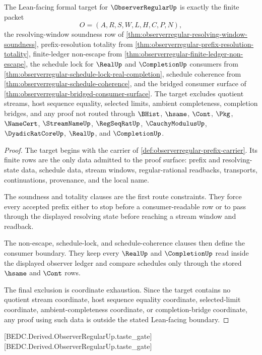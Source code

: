 \begin{theorem}
\label{thm:observerregular-formal-target-boundary}
The Lean-facing formal target for $\ObserverRegularUp$ is exactly the finite packet
$$
O=(A,R,S,W,L,H,C,P,N),
$$
the resolving-window soundness row of \autoref{thm:observerregular-resolving-window-soundness}, prefix-resolution totality from \autoref{thm:observerregular-prefix-resolution-totality}, finite-ledger non-escape from \autoref{thm:observerregular-finite-ledger-non-escape}, the schedule lock for $\RealUp$ and $\CompletionUp$ consumers from \autoref{thm:observerregular-schedule-lock-real-completion}, schedule coherence from \autoref{thm:observerregular-schedule-coherence}, and the bridged consumer surface of \autoref{thm:observerregular-bridged-consumer-surface}. The target excludes quotient streams, host sequence equality, selected limits, ambient completeness, completion bridges, and any proof not routed through $\BHist$, $\hsame$, $\Cont$, $\Pkg$, $\NameCert$, $\StreamNameUp$, $\RegSeqRatUp$, $\CauchyModulusUp$, $\DyadicRatCoreUp$, $\RealUp$, and $\CompletionUp$.
\end{theorem}
\begin{proof}
The target begins with the carrier of \autoref{def:observerregular-prefix-carrier}. Its finite rows are the only data admitted to the proof surface: prefix and resolving-state data, schedule data, stream windows, regular-rational readbacks, transports, continuations, provenance, and the local name.

The soundness and totality clauses are the first route constraints. They force every accepted prefix either to stop before a consumer-readable row or to pass through the displayed resolving state before reaching a stream window and readback.

The non-escape, schedule-lock, and schedule-coherence clauses then define the consumer boundary. They keep every $\RealUp$ and $\CompletionUp$ read inside the displayed observer ledger and compare schedules only through the stored $\hsame$ and $\Cont$ rows.

The final exclusion is coordinate exhaustion. Since the target contains no quotient stream coordinate, host sequence equality coordinate, selected-limit coordinate, ambient-completeness coordinate, or completion-bridge coordinate, any proof using such data is outside the stated Lean-facing boundary.
\end{proof}

[BEDC.Derived.ObserverRegularUp.taste\_gate]
[BEDC.Derived.ObserverRegularUp.taste\_gate]

